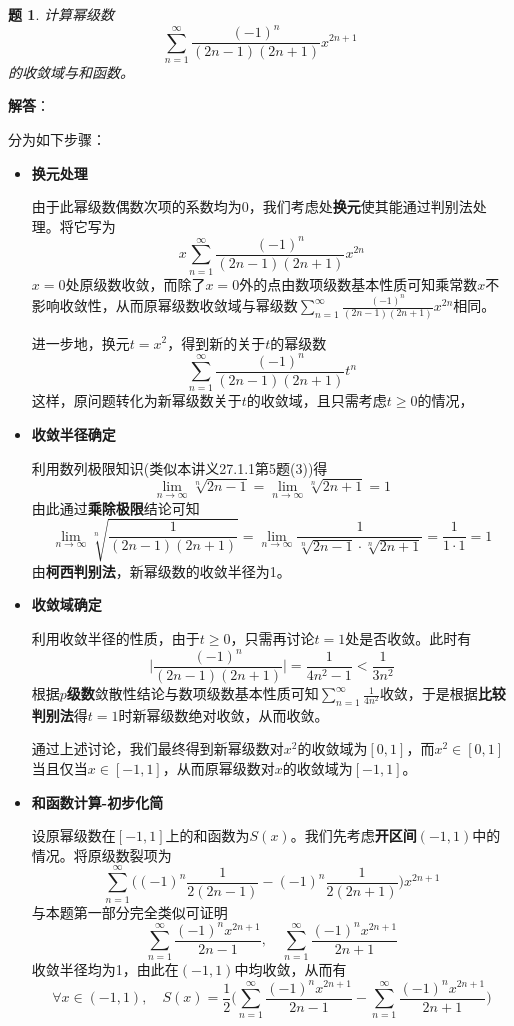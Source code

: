 \documentclass[a4paper,UTF8,fontset=windows,AutoFakeBold]{ctexart}
\newcommand*{\suminf}[1][n=1]{\sum_{#1}^\infty}
\theoremstyle{ex}
\newtheorem{exercise}{题}
\newcommand{\sol}[1]{{\vspace{5pt}\kaishu\noindent\textbf{解答}：\vspace{-3pt}
\begin{compactitem}
    \item[] #1
\end{compactitem}
}}
\begin{document}
\begin{framed}
\begin{exercise}\label{poly close}
    计算幂级数
    $$\suminf\frac{(-1)^n}{(2n-1)(2n+1)}x^{2n+1}$$
    的收敛域与和函数。
\end{exercise}
\sol{
    分为如下步骤：
    \begin{itemize}
        \item \textbf{换元处理}
        
        由于此幂级数偶数次项的系数均为0，我们考虑处\textbf{换元}使其能通过判别法处理。将它写为
        $$x\suminf\frac{(-1)^n}{(2n-1)(2n+1)}x^{2n}$$
        $x=0$处原级数收敛，而除了$x=0$外的点由数项级数基本性质可知乘常数$x$不影响收敛性，从而原幂级数收敛域与幂级数$\suminf\frac{(-1)^n}{(2n-1)(2n+1)}x^{2n}$相同。

        进一步地，换元$t=x^2$，得到新的关于$t$的幂级数
        $$\suminf\frac{(-1)^n}{(2n-1)(2n+1)}t^n$$
        这样，原问题转化为新幂级数关于$t$的收敛域，且只需考虑$t\ge0$的情况，

        \item \textbf{收敛半径确定}
        
        利用数列极限知识(类似本讲义27.1.1第5题(3))得
        $$\lim_{n\to\infty}\sqrt[n]{2n-1}=\lim_{n\to\infty}\sqrt[n]{2n+1}=1$$
        由此通过\textbf{乘除极限}结论可知
        $$\lim_{n\to\infty}\sqrt[n]{\frac{1}{(2n-1)(2n+1)}}=\lim_{n\to\infty}\frac{1}{\sqrt[n]{2n-1}\cdot\sqrt[n]{2n+1}}=\frac{1}{1\cdot1}=1$$
        由\textbf{柯西判别法}，新幂级数的收敛半径为1。

        \item \textbf{收敛域确定}
        
        利用收敛半径的性质，由于$t\ge0$，只需再讨论$t=1$处是否收敛。此时有
        $$\bigg|\frac{(-1)^n}{(2n-1)(2n+1)}\bigg|=\frac{1}{4n^2-1}<\frac{1}{3n^2}$$
        根据\textbf{$p$级数}敛散性结论与数项级数基本性质可知$\suminf\frac{1}{4n^2}$收敛，于是根据\textbf{比较判别法}得$t=1$时新幂级数绝对收敛，从而收敛。

        通过上述讨论，我们最终得到新幂级数对$x^2$的收敛域为$[0,1]$，而$x^2\in[0,1]$当且仅当$x\in[-1,1]$，从而原幂级数对$x$的收敛域为$[-1,1]$。

        \item \textbf{和函数计算-初步化简}
        
        设原幂级数在$[-1,1]$上的和函数为$S(x)$。我们先考虑\textbf{开区间}$(-1,1)$中的情况。将原级数裂项为
        $$\suminf\bigg((-1)^n\frac{1}{2(2n-1)}-(-1)^n\frac{1}{2(2n+1)}\bigg)x^{2n+1}$$
        与本题第一部分完全类似可证明
        $$\suminf\frac{(-1)^nx^{2n+1}}{2n-1},\quad\suminf\frac{(-1)^nx^{2n+1}}{2n+1}$$
        收敛半径均为1，由此在$(-1,1)$中均收敛，从而有
        $$\forall x\in(-1,1),\quad S(x)=\frac{1}{2}\bigg(\suminf\frac{(-1)^nx^{2n+1}}{2n-1}-\suminf\frac{(-1)^nx^{2n+1}}{2n+1}\bigg)$$


\end{itemize}}
\end{framed}
\end{document}
